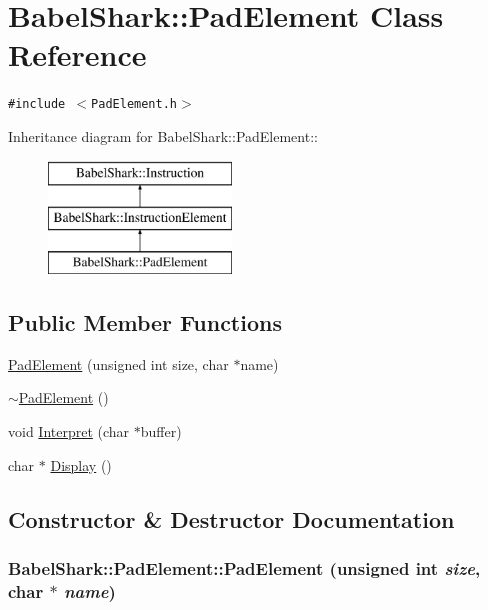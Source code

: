 \hypertarget{class_babel_shark_1_1_pad_element}{
\section{BabelShark::PadElement Class Reference}
\label{class_babel_shark_1_1_pad_element}
}
{\tt \#include $<$PadElement.h$>$}

Inheritance diagram for BabelShark::PadElement::\begin{figure}[H]
\begin{center}
\leavevmode
\includegraphics[height=3cm]{class_babel_shark_1_1_pad_element}
\end{center}
\end{figure}
\subsection*{Public Member Functions}
\begin{CompactItemize}
\item 
\hyperlink{class_babel_shark_1_1_pad_element_6d2289309a00458a98301a95d9c0d180}{PadElement} (unsigned int size, char $\ast$name)
\item 
\hyperlink{class_babel_shark_1_1_pad_element_5790e609a9f2c5206f9fdd0a81ab3a0c}{$\sim$PadElement} ()
\item 
void \hyperlink{class_babel_shark_1_1_pad_element_06d4d9d5aca06773f994b794114bb093}{Interpret} (char $\ast$buffer)
\item 
char $\ast$ \hyperlink{class_babel_shark_1_1_pad_element_aa1ddf32a942c6ea6c63eefe67f2521d}{Display} ()
\end{CompactItemize}


\subsection{Constructor \& Destructor Documentation}
\hypertarget{class_babel_shark_1_1_pad_element_6d2289309a00458a98301a95d9c0d180}{
\subsubsection[{PadElement}]{\setlength{\rightskip}{0pt plus 5cm}BabelShark::PadElement::PadElement (unsigned int {\em size}, \/  char $\ast$ {\em name})}}
\label{class_babel_shark_1_1_pad_element_6d2289309a00458a98301a95d9c0d180}


